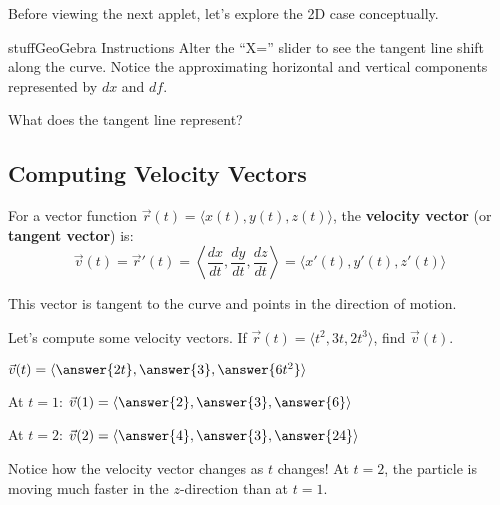 \documentclass{ximera}
\begin{document}
\begin{problem}
Before viewing the next applet, let's explore the 2D case conceptually.

\begin{expandable}{stuff}{GeoGebra Instructions}
    Alter the ``X='' slider to see the tangent line shift along the curve. Notice the approximating horizontal and vertical components represented by $dx$ and $df$.
\end{expandable}

\begin{center}
\end{center}

What does the tangent line represent?
\begin{multipleChoice}
\end{multipleChoice}
\end{problem}

\subsection*{Computing Velocity Vectors}

\begin{definition}
For a vector function $\vec{r}(t) = \langle x(t), y(t), z(t) \rangle$, the \textbf{velocity vector} (or \textbf{tangent vector}) is:
$$\vec{v}(t) = \vec{r}'(t) = \left\langle \frac{dx}{dt}, \frac{dy}{dt}, \frac{dz}{dt} \right\rangle = \langle x'(t), y'(t), z'(t) \rangle$$

This vector is tangent to the curve and points in the direction of motion.
\end{definition}

\begin{problem}
Let's compute some velocity vectors. If $\vec{r}(t) = \langle t^2, 3t, 2t^3 \rangle$, find $\vec{v}(t)$.

$\vec{v}(t) = \langle \answer{2t}, \answer{3}, \answer{6t^2} \rangle$

At $t=1$: $\vec{v}(1) = \langle \answer{2}, \answer{3}, \answer{6} \rangle$

At $t=2$: $\vec{v}(2) = \langle \answer{4}, \answer{3}, \answer{24} \rangle$

\begin{feedback}
Notice how the velocity vector changes as $t$ changes! At $t=2$, the particle is moving much faster in the $z$-direction than at $t=1$.
\end{feedback}
\end{problem}
\end{document}
